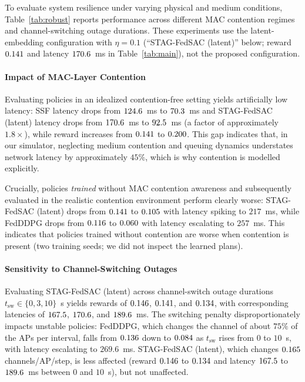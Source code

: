 To evaluate system resilience under varying physical and medium conditions, Table~\ref{tab:robust} reports performance across different MAC contention regimes and channel-switching outage durations. These experiments use the latent-embedding configuration with $\eta=0.1$ (``STAG-FedSAC (latent)'' below; reward $0.141$ and latency $170.6$~ms in Table~\ref{tab:main}), not the proposed configuration.

\paragraph{Impact of MAC-Layer Contention} 
Evaluating policies in an idealized contention-free setting yields artificially low latency: SSF latency drops from $124.6$~ms to $70.3$~ms and STAG-FedSAC (latent) latency drops from $170.6$~ms to $92.5$~ms (a factor of approximately $1.8\times$), while reward increases from $0.141$ to $0.200$. This gap indicates that, in our simulator, neglecting medium contention and queuing dynamics understates network latency by approximately $45\%$, which is why contention is modelled explicitly.

Crucially, policies \emph{trained} without MAC contention awareness and subsequently evaluated in the realistic contention environment perform clearly worse: STAG-FedSAC (latent) drops from $0.141$ to $0.105$ with latency spiking to $217$~ms, while FedDDPG drops from $0.116$ to $0.060$ with latency escalating to $257$~ms. This indicates that policies trained without contention are worse when contention is present (two training seeds; we did not inspect the learned plans).

\paragraph{Sensitivity to Channel-Switching Outages} 
Evaluating STAG-FedSAC (latent) across channel-switch outage durations $t_{\mathrm{sw}} \in \{0, 3, 10\}$~s yields rewards of $0.146$, $0.141$, and $0.134$, with corresponding latencies of $167.5$, $170.6$, and $189.6$~ms. The switching penalty disproportionately impacts unstable policies: FedDDPG, which changes the channel of about $75\%$ of the APs per interval, falls from $0.136$ down to $0.084$ as $t_{\mathrm{sw}}$ rises from $0$ to $10$~s, with latency escalating to $269.6$~ms. STAG-FedSAC (latent), which changes $0.165$ channels/AP/step, is less affected (reward $0.146$ to $0.134$ and latency $167.5$ to $189.6$~ms between $0$ and $10$~s), but not unaffected.
